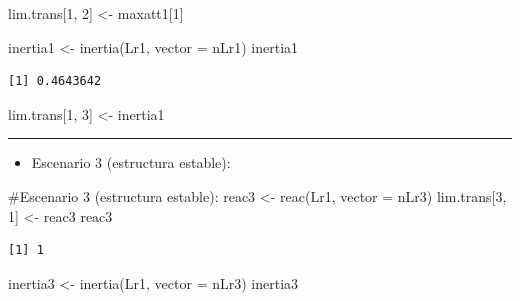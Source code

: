 \documentclass[
  12pt,
  letterpaper,
]{book}
\newenvironment{Shaded}{\begin{snugshade}}{\end{snugshade}}
\newcommand{\AttributeTok}[1]{\textcolor[rgb]{0.40,0.45,0.13}{#1}}
\newcommand{\CommentTok}[1]{\textcolor[rgb]{0.37,0.37,0.37}{#1}}
\newcommand{\DecValTok}[1]{\textcolor[rgb]{0.68,0.00,0.00}{#1}}
\newcommand{\FunctionTok}[1]{\textcolor[rgb]{0.28,0.35,0.67}{#1}}
\newcommand{\NormalTok}[1]{\textcolor[rgb]{0.00,0.23,0.31}{#1}}
\newcommand{\OtherTok}[1]{\textcolor[rgb]{0.00,0.23,0.31}{#1}}
\providecommand{\tightlist}{%
  \setlength{\itemsep}{0pt}\setlength{\parskip}{0pt}}\usepackage{longtable,booktabs,array}
\begin{document}
\begin{Shaded}
\begin{Highlighting}[]
\NormalTok{lim.trans[}\DecValTok{1}\NormalTok{, }\DecValTok{2}\NormalTok{] }\OtherTok{\textless{}{-}}\NormalTok{ maxatt1[}\DecValTok{1}\NormalTok{]}

\NormalTok{inertia1 }\OtherTok{\textless{}{-}} \FunctionTok{inertia}\NormalTok{(Lr1, }\AttributeTok{vector =}\NormalTok{ nLr1)}
\NormalTok{inertia1}
\end{Highlighting}
\end{Shaded}

\begin{verbatim}
[1] 0.4643642
\end{verbatim}

\begin{Shaded}
\begin{Highlighting}[]
\NormalTok{lim.trans[}\DecValTok{1}\NormalTok{, }\DecValTok{3}\NormalTok{] }\OtherTok{\textless{}{-}}\NormalTok{ inertia1}
\end{Highlighting}
\end{Shaded}

\begin{center}\rule{0.5\linewidth}{0.5pt}\end{center}

\begin{itemize}
\tightlist
\item
  Escenario 3 (estructura estable):
\end{itemize}

\begin{Shaded}
\begin{Highlighting}[]
\CommentTok{\#Escenario 3 (estructura estable):}
\NormalTok{reac3 }\OtherTok{\textless{}{-}} \FunctionTok{reac}\NormalTok{(Lr1, }\AttributeTok{vector =}\NormalTok{ nLr3)}
\NormalTok{lim.trans[}\DecValTok{3}\NormalTok{, }\DecValTok{1}\NormalTok{] }\OtherTok{\textless{}{-}}\NormalTok{ reac3}
\NormalTok{reac3}
\end{Highlighting}
\end{Shaded}

\begin{verbatim}
[1] 1
\end{verbatim}

\begin{Shaded}
\begin{Highlighting}[]
\NormalTok{inertia3 }\OtherTok{\textless{}{-}} \FunctionTok{inertia}\NormalTok{(Lr1, }\AttributeTok{vector =}\NormalTok{ nLr3)}
\NormalTok{inertia3}
\end{Highlighting}
\end{Shaded}
\end{document}
